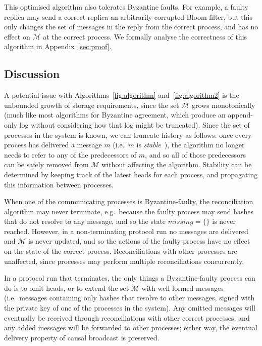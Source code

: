 \documentclass[a4paper,anonymous,USenglish]{lipics-v2019}
\begin{document}
This optimised algorithm also tolerates Byzantine faults.
For example, a faulty replica may send a correct replica an arbitrarily corrupted Bloom filter, but this only changes the set of messages in the reply from the correct process, and has no effect on $\mathcal{M}$ at the correct process.
We formally analyse the correctness of this algorithm in Appendix~\ref{sec:proof}.

\subsection{Discussion}

A potential issue with Algorithms~\ref{fig:algorithm} and~\ref{fig:algorithm2} is the unbounded growth of storage requirements, since the set $\mathcal{M}$ grows monotonically (much like most algorithms for Byzantine agreement, which produce an append-only log without considering how that log might be truncated).
Since the set of processes in the system is known, we can truncate history as follows: once every process has delivered a message $m$ (i.e.\ $m$ is \emph{stable}~\cite{Birman:1991el}), the algorithm no longer needs to refer to any of the predecessors of $m$, and so all of those predecessors can be safely removed from $\mathcal{M}$ without affecting the algorithm.
Stability can be determined by keeping track of the latest heads for each process, and propagating this information between processes.

When one of the communicating processes is Byzantine-faulty, the reconciliation algorithm may never terminate, e.g.\ because the faulty process may send hashes that do not resolve to any message, and so the state $\mathit{missing} = \{\}$ is never reached.
However, in a non-terminating protocol run no messages are delivered and $\mathcal{M}$ is never updated, and so the actions of the faulty process have no effect on the state of the correct process.
Reconciliations with other processes are unaffected, since processes may perform multiple reconciliations concurrently.

In a protocol run that terminates, the only things a Byzantine-faulty process can do is to omit heads, or to extend the set $\mathcal{M}$ with well-formed messages (i.e.\ messages containing only hashes that resolve to other messages, signed with the private key of one of the processes in the system).
Any omitted messages will eventually be received through reconciliations with other correct processes, and any added messages will be forwarded to other processes; either way, the eventual delivery property of causal broadcast is preserved.
\end{document}

